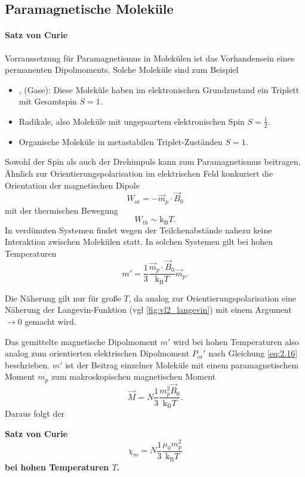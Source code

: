\subsection{Paramagnetische Moleküle}
	\paragraph{Satz von Curie}
	Vorraussetzung für Paramagnetismus in Molekülen ist das Vorhandensein eines permanenten Dipolmoments. Solche Moleküle sind zum Beispiel
	\begin{itemize}
		\item {},  (Gase): Diese Moleküle haben im elektronischen Grundzustand ein Triplett mit Gesamtspin $S=1$.
		\item Radikale, also Moleküle mit ungepaartem elektronischen Spin $S=\frac{1}{2}$.
		\item Organische Moleküle in metastabilen Triplet-Zuständen $S = 1$.
	\end{itemize}
	Sowohl der Spin als auch der Drehimpuls kann zum Paramagnetismus beitragen.\\

	Ähnlich zur Orientierungspolarisation im elektrischen Feld konkuriert die Orientation der magnetischen Dipole 
	$$
	W_{\text{or}} = - \Vec{m}_{p}\cdot\Vec{B}_{0}
	$$ 
	mit der thermischen Bewegung 
	$$
	W_{\text{th}} \sim \mathrm{k}_{\mathrm{B}} T.
	$$
	In verdünnten Systemen findet wegen der Teilchenabstände nahezu keine Interaktion zwischen Molekülen statt. In solchen Systemen gilt {bei hohen Temperaturen}
	\begin{equation}
		\label{eq:2.36}
		m' = \frac{1}{3} \frac{\Vec{m}_{p}\cdot\Vec{B}_{0}}{\mathrm{k}_{\mathrm{B}} T} \Vec{m}_{p}.
	\end{equation}
	\begin{verbal}
		Die Näherung gilt nur für große $T$, da analog zur Orientierungspolarisation eine Näherung der Langevin-Funktion (vgl \autoref{fig:vl2_langevin}) mit einem Argument $\to 0$ gemacht wird.
	\end{verbal}
	Das gemittelte magnetische Dipolmoment $m'$ wird bei hohen Temperaturen also analog zum orientierten elektrischen Dipolmoment $P_\text{or}'$ nach Gleichung \eqref{eq:2.16} beschrieben.
	$m'$ ist der Beitrag einzelner Moleküle mit einem paramagnetischem Moment $m_{p}$ zum makroskopischen magnetischen Moment 
	\begin{equation}
		\label{eq:2.37}
		\Vec{M} = N \frac{1}{3} \frac{m_{p}^2 \Vec{B}_{0}}{\mathrm{k}_{\mathrm{B}}T}.
	\end{equation}
	Daraus folgt der
	\begin{important}
		\textbf{Satz von Curie}\\
		\begin{equation}
			\label{eq:2.38}
			\chi_{m} = N \frac{1}{3} \frac{ \mu_0 m_{p}^2}{\mathrm{k}_{\mathrm{B}} T}
		\end{equation}
		\textbf{bei hohen Temperaturen $T$.}
	\end{important}

